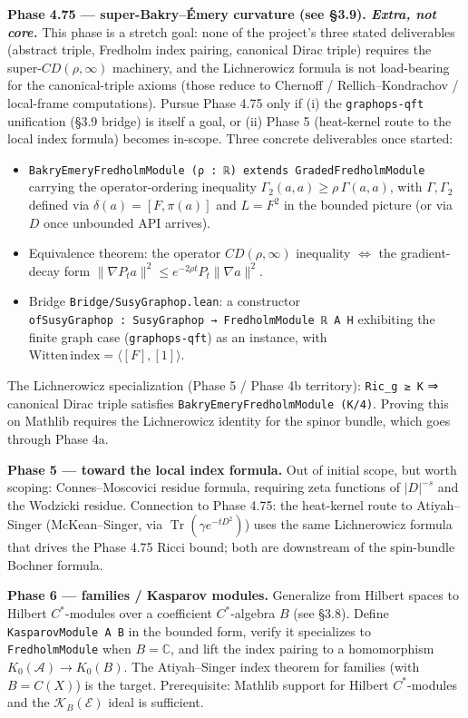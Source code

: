 \documentclass[
  11pt,
]{article}
\newcounter{none} %
\providecommand{\tightlist}{%
  \setlength{\itemsep}{0pt}\setlength{\parskip}{0pt}}
\begin{document}
\textbf{Phase 4.75 --- super-Bakry--Émery curvature (see §3.9).
\emph{Extra, not core.}} This phase is a stretch goal: none of the
project's three stated deliverables (abstract triple, Fredholm index
pairing, canonical Dirac triple) requires the super-\(CD(\rho, \infty)\)
machinery, and the Lichnerowicz formula is not load-bearing for the
canonical-triple axioms (those reduce to Chernoff / Rellich--Kondrachov
/ local-frame computations). Pursue Phase 4.75 only if (i) the
\texttt{graphops-qft} unification (§3.9 bridge) is itself a goal, or
(ii) Phase 5 (heat-kernel route to the local index formula) becomes
in-scope. Three concrete deliverables once started:

\begin{itemize}
\tightlist
\item
  \texttt{BakryEmeryFredholmModule\ (ρ\ :\ ℝ)\ extends\ GradedFredholmModule}
  carrying the operator-ordering inequality
  \(\Gamma_2(a, a) \geq \rho\,\Gamma(a, a)\), with \(\Gamma, \Gamma_2\)
  defined via \(\delta(a) = [F, \pi(a)]\) and \(L = F^2\) in the bounded
  picture (or via \(D\) once unbounded API arrives).
\item
  Equivalence theorem: the operator \(CD(\rho, \infty)\) inequality
  \(\Leftrightarrow\) the gradient-decay form \(\|\nabla P_t a\|^2 \leq
  e^{-2\rho t} P_t\|\nabla a\|^2\).
\item
  Bridge \texttt{Bridge/SusyGraphop.lean}: a constructor
  \texttt{ofSusyGraphop\ :\ SusyGraphop\ →\ FredholmModule\ ℝ\ A\ H}
  exhibiting the finite graph case (\texttt{graphops-qft}) as an
  instance, with \(\mathrm{Witten\,index} = \langle [F], [1] \rangle\).
\end{itemize}

The Lichnerowicz specialization (Phase 5 / Phase 4b territory):
\texttt{Ric\_g\ ≥\ K} ⇒ canonical Dirac triple satisfies
\texttt{BakryEmeryFredholmModule\ (K/4)}. Proving this on Mathlib
requires the Lichnerowicz identity for the spinor bundle, which goes
through Phase 4a.

\textbf{Phase 5 --- toward the local index formula.} Out of initial
scope, but worth scoping: Connes--Moscovici residue formula, requiring
zeta functions of \(|D|^{-s}\) and the Wodzicki residue. Connection to
Phase 4.75: the heat-kernel route to Atiyah--Singer (McKean--Singer, via
\(\mathop{\mathrm{Tr}}(\gamma e^{-tD^2})\)) uses the same Lichnerowicz
formula that drives the Phase 4.75 Ricci bound; both are downstream of
the spin-bundle Bochner formula.

\textbf{Phase 6 --- families / Kasparov modules.} Generalize from
Hilbert spaces to Hilbert \(C^*\)-modules over a coefficient
\(C^*\)-algebra \(B\) (see §3.8). Define \texttt{KasparovModule\ A\ B}
in the bounded form, verify it specializes to \texttt{FredholmModule}
when \(B = \mathbb{C}\), and lift the index pairing to a homomorphism
\(K_0(\mathcal{A}) \to K_0(B)\). The Atiyah--Singer index theorem for
families (with \(B = C(X)\)) is the target. Prerequisite: Mathlib
support for Hilbert \(C^*\)-modules and the
\(\mathcal{K}_B(\mathcal{E})\) ideal is sufficient.
\end{document}
